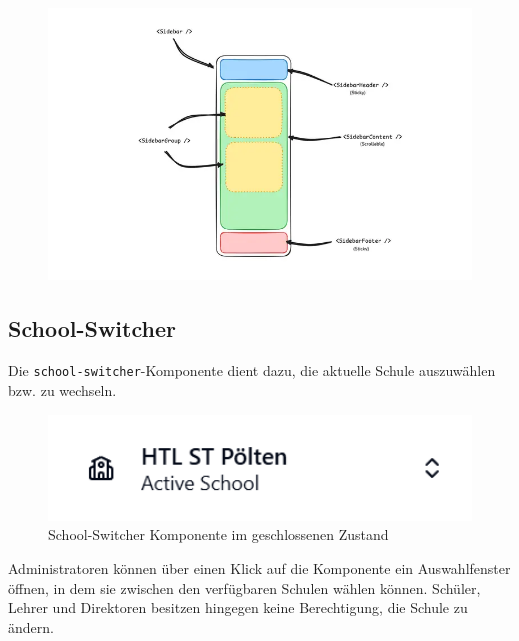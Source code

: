 \begin{inhalt}
\begin{enumerate}[label=\textbf{\arabic*.}]

\begin{figure}[!htb]
\centering
\includegraphics[width=1\textwidth]{files/Thomas/pics/Website/Sidebar/sidebar-aufbau.png}
\caption[Bildbezeichnung für Abbildungsverzeichnis]{}
\label{fig:gehaeuse_internet_bild}
\end{figure}

\newpage

\subsection{School-Switcher}

Die \texttt{school-switcher}-Komponente dient dazu, die aktuelle Schule auszuwählen bzw. zu wechseln.

\begin{figure}[!htb]
\centering
\includegraphics[width=1\textwidth]{files/Thomas/pics/Website/Sidebar/school-switcher/school-switcher.png}
\caption[School-Switcher Komponente geschlossen]{School-Switcher Komponente im geschlossenen Zustand}
\label{fig:school_switcher_closed}
\end{figure}

Administratoren können über einen Klick auf die Komponente ein Auswahlfenster öffnen, in dem sie zwischen den verfügbaren Schulen wählen können.  
Schüler, Lehrer und Direktoren besitzen hingegen keine Berechtigung, die Schule zu ändern.


\end{enumerate}
\end{inhalt}
